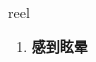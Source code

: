 
\begin{frame}
{\huge reel}
\begin{center}
\begin{enumerate}\Large
  \item \textbf{感到眩晕}
\end{enumerate}
\end{center}
\end{frame}
